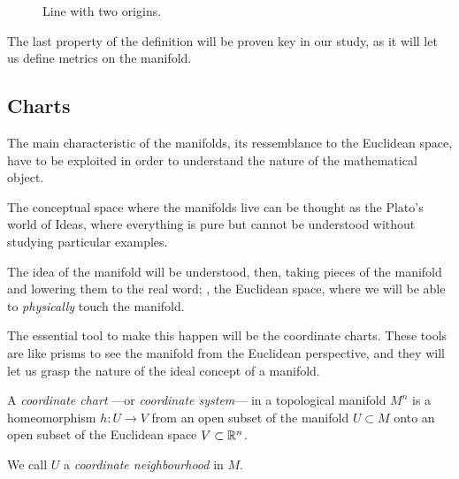 \begin{figure}[bth]
    \myfloatalign
    \caption[Line with two origins]{Line with two origins.}
    \label{fig:2origin}
\end{figure}

The last property of the definition will be proven key in our study, as it will let us define metrics on the manifold.

\subsection{Charts}

The main characteristic of the manifolds, its ressemblance to the Euclidean space, have to be exploited in order to understand the nature of the mathematical object.

The conceptual space where the manifolds live can be thought as the Plato's world of Ideas, where everything is pure but cannot be understood without studying particular examples.

The idea of the manifold will be understood, then, taking pieces of the manifold and lowering them to the real word; \ie, the Euclidean space, where we will be able to \emph{physically} touch the manifold.

The essential tool to make this happen will be the coordinate charts. These tools are like prisms to see the manifold from the Euclidean perspective, and they will let us grasp the nature of the ideal concept of a manifold.

\begin{definition}
    A \emph{coordinate chart} ---or \emph{coordinate system}--- in a topological manifold $M^n$ is a homeomorphism $h \colon U \to V$ from an open subset of the manifold $U \subset M$ onto an open subset of the Euclidean space $V \subset \mathbb{R}^n$.

    We call $U$ a \emph{coordinate neighbourhood} in $M$.
\end{definition}


